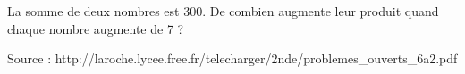 
La  somme  de  deux  nombres  est  300.  De  combien  augmente  leur  produit  quand chaque nombre augmente de 7 ? 

\hfill{{\scriptsize Source : http://laroche.lycee.free.fr/telecharger/2nde/problemes\_ouverts\_6a2.pdf}}